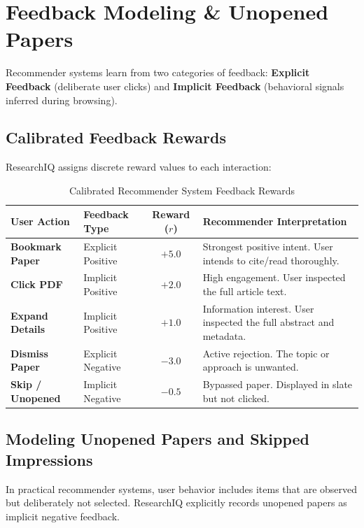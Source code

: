 \documentclass[11pt,a4paper]{article}
\begin{document}
\section{Feedback Modeling \& Unopened Papers}

Recommender systems learn from two categories of feedback: \textbf{Explicit Feedback} (deliberate user clicks) and \textbf{Implicit Feedback} (behavioral signals inferred during browsing).

\subsection{Calibrated Feedback Rewards}
ResearchIQ assigns discrete reward values to each interaction:
\begin{table}[H]
\centering
\small
\caption{Calibrated Recommender System Feedback Rewards}
\label{tab:feedback_rewards}
\begin{tabular}{@{}llcp{6.5cm}@{}}
\toprule
\textbf{User Action} & \textbf{Feedback Type} & \textbf{Reward ($r$)} & \textbf{Recommender Interpretation} \\
\midrule
\textbf{Bookmark Paper} & Explicit Positive & $+5.0$ & Strongest positive intent. User intends to cite/read thoroughly. \\
\textbf{Click PDF} & Implicit Positive & $+2.0$ & High engagement. User inspected the full article text. \\
\textbf{Expand Details} & Implicit Positive & $+1.0$ & Information interest. User inspected the full abstract and metadata. \\
\textbf{Dismiss Paper} & Explicit Negative & $-3.0$ & Active rejection. The topic or approach is unwanted. \\
\textbf{Skip / Unopened} & Implicit Negative & $-0.5$ & Bypassed paper. Displayed in slate but not clicked. \\
\bottomrule
\end{tabular}
\end{table}

\subsection{Modeling Unopened Papers and Skipped Impressions}
In practical recommender systems, user behavior includes items that are observed but deliberately not selected. ResearchIQ explicitly records unopened papers as implicit negative feedback.
\end{document}
